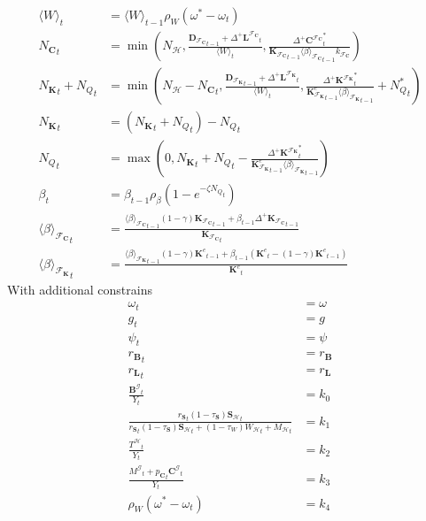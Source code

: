 \documentclass[a4paper, headings=standardclasses]{scrartcl}
\numberwithin{equation}{subsection}
\begin{document}
{\begin{align}
		\langle W \rangle_t & = \langle W \rangle_{t-1} \rho_W (\omega^* - \omega_t) \\
		{N_\mathbf{C}}_t & = \min\left(N_\mathcal{H}, \frac{{\mathbf{D}_{\mathcal{F}_\mathbf{C}}}_{t-1} + {\Delta^+{\mathbf{L}^{\mathcal{F}_\mathbf{C}}}}_{t}}{{\langle W \rangle}_t},\frac{{\Delta^+ {\mathbf{C}^{\mathcal{F}_\mathbf{C}}}}^*_t}{{\mathbf{K}_{\mathcal{F}_\mathbf{C}}}_{t-1} {\langle \beta \rangle_{\mathcal{F}_\mathbf{C}}}_{t-1} k_{\mathcal{F}_\mathbf{C}}}\right)\\
		{N_\mathbf{K}}_t + {N_Q}_t & = \min\left(N_\mathcal{H} - {N_\mathbf{C}}_t, \frac{{\mathbf{D}_{\mathcal{F}_\mathbf{K}}}_{t-1} + {\Delta^+{\mathbf{L}^{\mathcal{F}_\mathbf{K}}}}_{t}}{{\langle W \rangle}_t},\frac{{\Delta^+ {\mathbf{K}^{\mathcal{F}_\mathbf{K}}}}^*_t}{{\mathbf{K}_{\mathcal{F}_\mathbf{K}}^e}_{t-1} {\langle \beta \rangle_{\mathcal{F}_\mathbf{K}}}_{t-1}} + {N_Q^*}_t\right)\\
		{N_\mathbf{K}}_t & = ({N_\mathbf{K}}_t + {N_Q}_t) - {N_Q}_t\\
		{N_Q}_t & = \max\left(0, {N_\mathbf{K}}_t + {N_Q}_t - \frac{{\Delta^+ {\mathbf{K}^{\mathcal{F}_\mathbf{K}}}}^*_t}{{\mathbf{K}_{\mathcal{F}_\mathbf{K}}^e}_{t-1} {\langle \beta \rangle_{\mathcal{F}_\mathbf{K}}}_{t-1}}\right) \\
		\beta_t & = \beta_{t-1} \rho_\beta (1-e^{-\zeta {N_Q}_t}) \\
		{\langle\beta\rangle_{\mathcal{F}_\mathbf{C}}}_{t} & =  \frac{{\langle\beta\rangle_{\mathcal{F}_\mathbf{C}}}_{t-1} (1 - \gamma) {\mathbf{K}_{\mathcal{F}_\mathbf{C}}}_{t-1} + \beta_{t-1} {\Delta^+ \mathbf{K}_{\mathcal{F}_\mathbf{C}}}_{t-1}}{{\mathbf{K}_{\mathcal{F}_\mathbf{C}}}_{t}} \\
		{\langle\beta\rangle_{\mathcal{F}_\mathbf{K}}}_{t} & = \frac{{\langle\beta\rangle_{\mathcal{F}_\mathbf{K}}}_{t-1} (1 - \gamma) {\mathbf{K}^e}_{t-1} + \beta_{t-1} ({\mathbf{K}^e}_{t} - (1 - \gamma) {\mathbf{K}^e}_{t-1})}{{\mathbf{K}^e}_{t}}
	\end{align}
}
With additional constrains
{\allowdisplaybreaks \tiny
	\begin{align}
		\omega_t &= \omega \\
		g_t &= g \\
		\psi_t &= \psi \\
		{r_\mathbf{B}}_t &= r_\mathbf{B} \\
		{r_\mathbf{L}}_t &= r_\mathbf{L} \\
		\frac{{\mathbf{B}^\mathcal{G}}_t}{Y_t} &= k_0 \\
		\frac{{r_\mathbf{S}}_t (1 - \tau_\mathbf{S}) {\mathbf{S}_\mathcal{H}}_t}{{r_\mathbf{S}}_t (1 - \tau_\mathbf{S}) {\mathbf{S}_\mathcal{H}}_t + (1 - \tau_W) {W_\mathcal{H}}_t + {M_\mathcal{H}}_t} &= k_1 \\
		\frac{{T^\mathcal{H}}_t}{Y_t} &= k_2 \\
		\frac{{M^\mathcal{G}}_t + {p_\mathbf{C}}_t {\mathbf{C}^\mathcal{G}}_t}{Y_t} &= k_3 \\
		\rho_W (\omega^* - \omega_t) &= k_4	
	\end{align}
}
\end{document}
